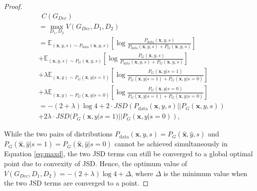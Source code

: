 \documentclass[sigconf]{acmart}
\theoremstyle{definition}
\begin{document}
\begin{proof}
{\begin{minipage}{\linewidth}
\begin{equation}
\begin{split}
   	&~~C(G_{Dec}) \\
	& = \max_{D_1,D_2} V(G_{Dec}, D_1, D_2) \\
   & = \mathbb{E}_{(\mathbf{x},y,s) \sim P_{\text{data}}(\mathbf{x},y,s)}[\log \frac{P_{\text{data}}(\mathbf{x},y,s)} {P_{\text{data}}(\mathbf{x},y,s)+P_{G}(\mathbf{x},y,s)}] \\
   & + \mathbb{E}_{(\mathbf{x},y,s) \sim P_{G}(\mathbf{x},y,s)}[\log \frac{P_{G}(\mathbf{x},y,s)} {P_{\text{data}}(\mathbf{x},y,s)+P_{G}(\mathbf{x},y,s)}] \\
   & + \lambda \mathbb{E}_{(\mathbf{x},y) \sim P_{G}(\mathbf{x},y|s=1)} [\log \frac{P_{G}(\mathbf{x},y|s=1)} {P_{G}(\mathbf{x},y|s=1)+P_{G}(\mathbf{x},y|s=0)}] \\
   & + \lambda \mathbb{E}_{(\mathbf{x},y) \sim P_{G}(\mathbf{x},y|s=0)} [\log \frac{P_{G}(\mathbf{x},y|s=0)} {P_{G}(\mathbf{x},y|s=1)+P_{G}(\mathbf{x},y|s=0)}] \\
   & =  -(2+\lambda) \log4 + 2 \cdot JSD(P_{\text{data}}(\mathbf{x},y,s)||P_{G}(\mathbf{x},y,s)) \\
   & + 2 \lambda \cdot JSD(P_{G}(\mathbf{x},y|s=1)||P_{G}(\mathbf{x},y|s=0)),
\end{split}
\end{equation}
\end{minipage}
}
While the two pairs of distributions $P_{\text{data}}(\mathbf{x},y,s)=P_{G}(\hat{\mathbf{x}},\hat{y},s)$ and $P_{G}(\hat{\mathbf{x}},\hat{y}|s=1)=P_{G}(\hat{\mathbf{x}},\hat{y}|s=0)$ cannot be achieved simultaneously in Equation \ref{eq:maxd}, the two JSD terms can still be converged to a global optimal point due to convexity of JSD. Hence, the optimum value of $V(G_{Dec}, D_1, D_2) = -(2+\lambda) \log4 + \Delta$, where $\Delta$ is the minimum value when the two JSD terms are converged to a point. 

\end{proof}
\end{document}
